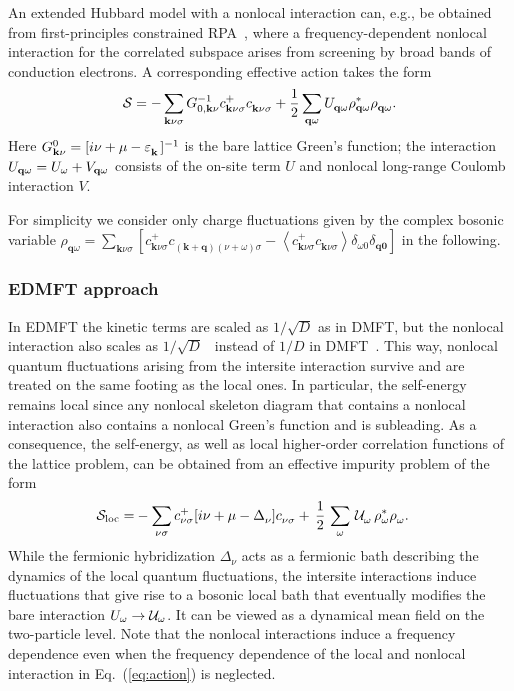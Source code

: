 \documentclass[rmp,aps,reprint,amsmath,amssymb,superscriptaddress,showpacs,nofootinbib]{revtex4-1}
\newcommand{\qv}{\ensuremath{\mathbf{q}}}
\newcommand{\av}[1]{\ensuremath{\left\langle #1 \right\rangle}}
\begin{document}
An extended Hubbard model with a nonlocal interaction can, e.g., be obtained from first-principles constrained RPA~\cite{Aryasetiawan2004}, where a frequency-dependent nonlocal interaction for the correlated subspace arises from screening by broad bands of conduction electrons.
A corresponding effective action takes the form
\begin{align}
\mathcal{S}=-\sum_{\mathbf{k}\nu\sigma} G_{0,\mathbf{k}\nu}^{-1}c^{+}_{\mathbf{k}\nu\sigma}c^{\phantom{+}}_{\mathbf{k}\nu\sigma}+\frac{1}{2}\sum_{{\bf q}\omega}U^{\phantom{+}}_{\bf q \omega }\rho^{*}_{\qv\omega}\rho^{\phantom{*}}_{\qv\omega}.
\label{eq:action}
\end{align}
Here $G^0_{\mathbf{k}\nu}=[i\nu+\mu-\varepsilon^{\phantom{+}}_{\bf k}]^{-1}$ is the bare lattice Green's function; the interaction $U_{\bf q\omega}=U_{\omega}+V_{\bf q\omega}$ consists of the on-site term $U$ and nonlocal long-range Coulomb interaction $V$.

For simplicity we consider only charge fluctuations given by the complex bosonic variable
$\rho^{\phantom{+}}_{\qv \omega} = \sum_{\mathbf{k} \nu\sigma}[c^{+}_{\mathbf{k} \nu\sigma}c^{\phantom{*}}_{(\mathbf{k}+\qv)(\nu+\omega)\sigma}-\av{c^{+}_{\mathbf{k}\nu\sigma}c^{\phantom{*}}_{\mathbf{k}\nu\sigma}}\delta_{\omega 0}\delta_{\qv \mathbf{0}}]$ in the following.

\subsubsection{EDMFT approach}

In EDMFT the kinetic terms are scaled as $1/\sqrt{D}$ as in DMFT, but the nonlocal interaction also scales as $1/\sqrt{D}$~\cite{Smith00} instead of  $1/{D}$ in DMFT~\cite{Muller-Hartmann1988}. This way, nonlocal quantum fluctuations arising from the intersite interaction survive and are treated on the same footing as the local ones. In particular, the self-energy  remains local since any nonlocal skeleton diagram that contains a nonlocal interaction also contains a nonlocal Green's function and  is  subleading.  As a consequence, the self-energy, as well as local higher-order correlation functions of the lattice problem, can be obtained from an effective impurity problem of the form
\begin{align}
\label{eq:imp_action0}
  \mathcal{S}_{\text{loc}}=&-\sum_{\nu\sigma} c^{+}_{\nu\sigma}[i\nu+\mu-\Delta^{\phantom{*}}_{\nu}]c^{\phantom{*}}_{\nu\sigma} 
  +\, \frac{1}{2}\,\sum_{\omega}\,{\cal U}^{\phantom{*}}_{\omega}\, \rho^*_{\omega} \rho^{\phantom{*}}_{\omega}.
\end{align}
While the fermionic hybridization $\Delta_{\nu}$ acts as a fermionic bath describing the dynamics of the local quantum fluctuations, the intersite interactions induce fluctuations that give rise to a  bosonic local bath that eventually modifies the bare  interaction $U_{\omega}\rightarrow {\cal U}_{\omega}$. It can be viewed as a dynamical mean field on the two-particle level. Note that the nonlocal interactions induce a frequency dependence even when the frequency dependence of the local and nonlocal interaction in Eq.~(\ref{eq:action}) is neglected.
\end{document}
